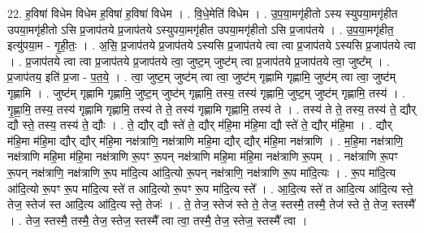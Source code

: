 \documentclass[17pt]{extarticle}
\begin{document}
22. ह॒विषा॑ विधेम विधेम ह॒विषा॑ ह॒विषा॑ विधेम । . वि॒धे॒मेति॑ विधेम । . उ॒प॒या॒मगृ॑हीतो ऽस्य स्युपया॒मगृ॑हीत उपया॒मगृ॑हीतो ऽसि प्र॒जाप॑तये प्र॒जाप॑तये 
ऽस्युपया॒मगृ॑हीत उपया॒मगृ॑हीतो ऽसि प्र॒जाप॑तये । . उ॒प॒या॒मगृ॑हीत॒ इत्यु॑पया॒म - गृ॒ही॒तः॒ । . अ॒सि॒ प्र॒जाप॑तये प्र॒जाप॑तये ऽस्यसि प्र॒जाप॑तये त्वा त्वा प्र॒जाप॑तये ऽस्यसि प्र॒जाप॑तये त्वा । . प्र॒जाप॑तये त्वा त्वा प्र॒जाप॑तये प्र॒जाप॑तये त्वा॒ जुष्ट॒म् जुष्ट॑म् त्वा प्र॒जाप॑तये प्र॒जाप॑तये त्वा॒ जुष्ट᳚म् । . प्र॒जाप॑तय॒ इति॑ प्र॒जा - प॒त॒ये॒ । . त्वा॒ जुष्ट॒म् जुष्ट॑म् त्वा त्वा॒ जुष्ट॑म् गृह्णामि गृह्णामि॒ जुष्ट॑म् त्वा त्वा॒ जुष्ट॑म् गृह्णामि । . जुष्ट॑म् गृह्णामि गृह्णामि॒ जुष्ट॒म् जुष्ट॑म् गृह्णामि॒ तस्य॒ तस्य॑ गृह्णामि॒ जुष्ट॒म् जुष्ट॑म् गृह्णामि॒ तस्य॑ । . गृ॒ह्णा॒मि॒ तस्य॒ तस्य॑ गृह्णामि गृह्णामि॒ तस्य॑ ते ते॒ तस्य॑ गृह्णामि गृह्णामि॒ तस्य॑ ते । . तस्य॑ ते ते॒ तस्य॒ तस्य॑ ते॒ द्यौर् द्यौ स्ते॒ तस्य॒ तस्य॑ ते॒ द्यौः । . ते॒ द्यौर् द्यौ स्ते॑ ते॒ द्यौर् म॑हि॒मा म॑हि॒मा द्यौ स्ते॑ ते॒ द्यौर् म॑हि॒मा । . द्यौर् म॑हि॒मा म॑हि॒मा द्यौर् द्यौर् म॑हि॒मा नक्ष॑त्राणि॒ नक्ष॑त्राणि महि॒मा द्यौर् द्यौर् म॑हि॒मा नक्ष॑त्राणि । . म॒हि॒मा नक्ष॑त्राणि॒ नक्ष॑त्राणि महि॒मा म॑हि॒मा नक्ष॑त्राणि रू॒पꣳ रू॒पन् नक्ष॑त्राणि महि॒मा म॑हि॒मा नक्ष॑त्राणि रू॒पम् । . नक्ष॑त्राणि रू॒पꣳ रू॒पन् नक्ष॑त्राणि॒ नक्ष॑त्राणि रू॒प मा॑दि॒त्य आ॑दि॒त्यो रू॒पन् नक्ष॑त्राणि॒ नक्ष॑त्राणि रू॒प मा॑दि॒त्यः । . रू॒प मा॑दि॒त्य आ॑दि॒त्यो रू॒पꣳ रू॒प मा॑दि॒त्य स्ते॑ त आदि॒त्यो रू॒पꣳ रू॒प मा॑दि॒त्य स्ते᳚ । . आ॒दि॒त्य स्ते॑ त आदि॒त्य आ॑दि॒त्य स्ते॒ तेज॒ स्तेज॑ स्त आदि॒त्य आ॑दि॒त्य स्ते॒ तेजः॑ । . ते॒ तेज॒ स्तेज॑ स्ते ते॒ तेज॒ स्तस्मै॒ तस्मै॒ तेज॑ स्ते ते॒ तेज॒ स्तस्मै᳚ । . तेज॒ स्तस्मै॒ तस्मै॒ तेज॒ स्तेज॒ स्तस्मै᳚ त्वा त्वा॒ तस्मै॒ तेज॒ स्तेज॒ स्तस्मै᳚ त्वा । \newline
\end{document}
